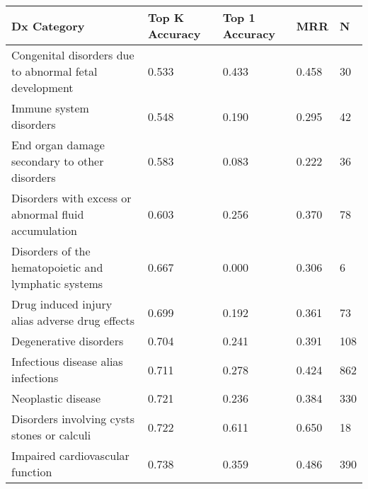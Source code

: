 



\begin{table*}
\centering
\begin{tabular}{p{}p{}p{}p{}p{}}
        \toprule
        \textbf{Dx Category} & \textbf{Top K Accuracy} & \textbf{Top 1 Accuracy} & \textbf{MRR} & \textbf{N} \\
        \midrule
        Congenital disorders due to abnormal fetal development & \cellcolor{blue!0}0.533 & \cellcolor{blue!34}0.433 & \cellcolor{blue!25}0.458 & \cellcolor{blue!0}30 \\
        Immune system disorders & \cellcolor{blue!7}0.548 & \cellcolor{blue!2}0.190 & \cellcolor{blue!10}0.295 & \cellcolor{blue!10}42 \\
        End organ damage secondary to other disorders & \cellcolor{blue!14}0.583 & \cellcolor{blue!0}0.083 & \cellcolor{blue!0}0.222 & \cellcolor{blue!7}36 \\
        Disorders with excess or abnormal fluid accumulation & \cellcolor{blue!22}0.603 & \cellcolor{blue!10}0.256 & \cellcolor{blue!12}0.370 & \cellcolor{blue!28}78 \\
        Disorders of the hematopoietic and lymphatic systems & \cellcolor{blue!34}0.667 & \cellcolor{blue!0}0.000 & \cellcolor{blue!10}0.306 & \cellcolor{blue!0}6 \\
        Drug induced injury alias adverse drug effects & \cellcolor{blue!40}0.699 & \cellcolor{blue!2}0.192 & \cellcolor{blue!15}0.361 & \cellcolor{blue!26}73 \\
        Degenerative disorders & \cellcolor{blue!45}0.704 & \cellcolor{blue!8}0.241 & \cellcolor{blue!20}0.391 & \cellcolor{blue!38}108 \\
        Infectious disease alias infections & \cellcolor{blue!49}0.711 & \cellcolor{blue!10}0.278 & \cellcolor{blue!25}0.424 & \cellcolor{blue!50}862 \\
        Neoplastic disease & \cellcolor{blue!50}0.721 & \cellcolor{blue!8}0.236 & \cellcolor{blue!22}0.384 & \cellcolor{blue!19}330 \\
        Disorders involving cysts stones or calculi & \cellcolor{blue!50}0.722 & \cellcolor{blue!43}0.611 & \cellcolor{blue!32}0.650 & \cellcolor{blue!0}18 \\
        Impaired cardiovascular function & \cellcolor{blue!50}0.738 & \cellcolor{blue!24}0.359 & \cellcolor{blue!32}0.486 & \cellcolor{blue!22}390 \\

\end{tabular}
\end{table*}
